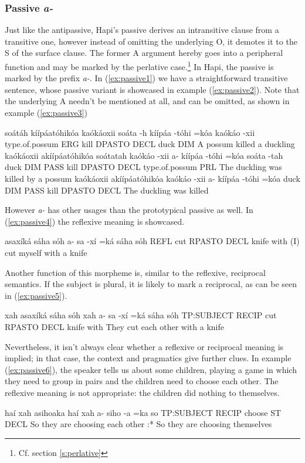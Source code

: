 \documentclass[a4paper, 12pt, oneside]{memoir}
\newcommand{\emh}[1]{\textit{#1}}
\begin{document}
\subsubsection{Passive \emh{a-}}\label{s:pass}
Just like the antipassive, Hapi's passive derives an intransitive clause from a transitive one, however instead of omitting the underlying O, it demotes it to the S of the surface clause. The former A argument hereby goes into a peripheral function and may be marked by the perlative case.\footnote{Cf. section \ref{s:perlative}} In Hapi, the passive is marked by the prefix \emh{a-}. In (\ref{ex:passive1}) we have a straightforward transitive sentence, whose passive variant is showcased in example (\ref{ex:passive2}). Note that the underlying A needn't be mentioned at all, and can be omitted, as shown in example (\ref{ex:passive3})
\begin{examples}
    \ex \label{ex:passive1}
    \words soátáh kíípáatóhikóa kaókáoxii
    \bits soáta -h kíípáa -tóhi =kóa kaókáo -xii
    \gloss type.of.possum ERG kill DPASTO DECL duck DIM
    \tr A possum killed a duckling
    \ex \label{ex:passive2}
    \words kaókáoxii akíípáatóhikóa soátatah
    \bits kaókáo -xii a- kíípáa -tóhi =kóa soáta -tah
    \gloss duck DIM PASS kill DPASTO DECL type.of.possum PRL
    \tr The duckling was killed by a possum
    \ex \label{ex:passive3}
    \words kaókáoxii akíípáatóhikóa
    \bits kaókáo -xii a- kíípáa -tóhi =kóa
    \gloss duck DIM PASS kill DPASTO DECL
    \tr The duckling was killed
\end{examples}
However \emh{a-} has other usages than the prototypical passive as well. In (\ref{ex:passive4}) the reflexive meaning is showcased. 
\begin{examples}
    \ex \label{ex:passive4}
    \words asaxíká sáha sóh
    \bits a- sa -xí =ká sáha sóh 
    \gloss REFL cut RPASTO DECL knife with
    \tr (I) cut myself with a knife
\end{examples}
Another function of this morpheme is, similar to the reflexive, reciprocal semantics. If the subject is plural, it is likely to mark a reciprocal, as can be seen in (\ref{ex:passive5}).
\begin{examples}
    \ex \label{ex:passive5}
    \words xah asaxíká sáha sóh
    \bits xah a- sa -xí =ká sáha sóh 
    \gloss TP:SUBJECT RECIP cut RPASTO DECL knife with
    \tr They cut each other with a knife
\end{examples}
Nevertheless, it isn't always clear whether a reflexive or reciprocal meaning is implied; in that case, the context and pragmatics give further clues. In example (\ref{ex:passive6}), the speaker tells us about some children, playing a game in which they need to group in pairs and the children need to choose each other. The reflexive meaning is not appropriate: the children did nothing to themselves.
\begin{examples}
    \ex \label{ex:passive6}
    \words haí xah asihoaka
    \bits haí xah a- siho -a =ka 
    \gloss so TP:SUBJECT RECIP choose ST DECL
    \tr So they are choosing each other
    \tr:* So they are choosing themselves
\end{examples} 
\end{document}
